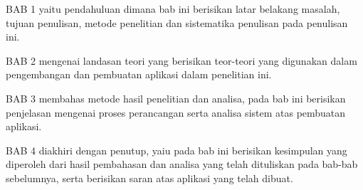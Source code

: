 \documentclass[pi.tex]{subfile}
\begin{document}
BAB 1 yaitu pendahuluan dimana bab ini berisikan latar belakang masalah, tujuan penulisan, metode penelitian dan sistematika penulisan pada penulisan ini.


BAB 2 mengenai landasan teori yang berisikan teor-teori yang digunakan dalam pengembangan dan pembuatan aplikasi dalam penelitian ini.


BAB 3 membahas metode hasil penelitian dan analisa, pada bab ini berisikan penjelasan mengenai proses perancangan serta analisa sistem atas pembuatan aplikasi.


BAB 4 diakhiri dengan penutup, yaiu pada bab ini berisikan kesimpulan yang diperoleh dari hasil pembahasan dan analisa yang telah dituliskan pada bab-bab sebelumnya, serta berisikan saran atas aplikasi yang telah dibuat.
\end{document}
